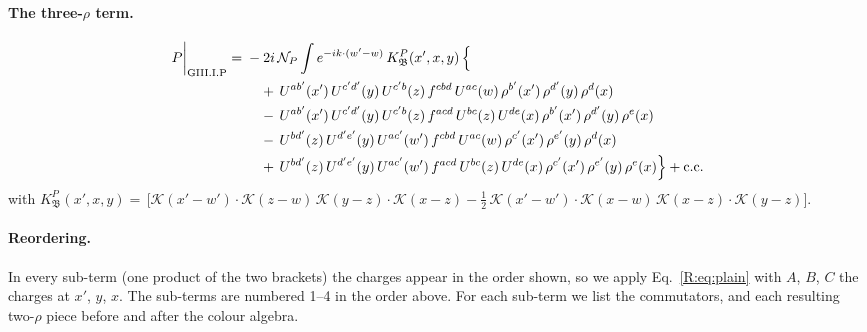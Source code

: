 \documentclass[10pt]{article}
\numberwithin{equation}{section}
\newcommand{\KK}{\mathcal K}
\newcommand{\NP}{\mathcal N_{P}}
\begin{document}
\paragraph{The three-$\rho$ term.}
\begin{align}
P\bigg|_{\rm GIII.I.P}={}&-2i\,\NP\int e^{-ik\cdot(w'-w)}\,K^{P}_{\mathfrak B}(x',x,y)\,\Big\{\notag\\
&\quad +\,U^{ab'}(x')\,U^{c'd'}(y)\,U^{c'b}(z)\,f^{cbd}\,U^{ac}(w)\,\rho^{b'}(x')\,\rho^{d'}(y)\,\rho^{d}(x)\notag\\
&\quad -\,U^{ab'}(x')\,U^{c'd'}(y)\,U^{c'b}(z)\,f^{acd}\,U^{bc}(z)\,U^{de}(x)\,\rho^{b'}(x')\,\rho^{d'}(y)\,\rho^{e}(x)\notag\\
&\quad -\,U^{bd'}(z)\,U^{d'e'}(y)\,U^{ac'}(w')\,f^{cbd}\,U^{ac}(w)\,\rho^{c'}(x')\,\rho^{e'}(y)\,\rho^{d}(x)\notag\\
&\quad +\,U^{bd'}(z)\,U^{d'e'}(y)\,U^{ac'}(w')\,f^{acd}\,U^{bc}(z)\,U^{de}(x)\,\rho^{c'}(x')\,\rho^{e'}(y)\,\rho^{e}(x)\Big\}+{\rm c.c.}\label{B:eq:in-GIII.I.P}
\end{align}
with $K^{P}_{\mathfrak B}(x',x,y)=\,\Big[\KK(x'-w')\cdot\KK(z-w)\,\KK(y-z)\cdot\KK(x-z)-\frac{1}{2}\,\KK(x'-w')\cdot\KK(x-w)\,\KK(x-z)\cdot\KK(y-z)\Big]$.
\paragraph{Reordering.} In every sub-term (one product of the two brackets) the charges appear in the order shown, so we apply Eq.~\eqref{R:eq:plain} with $A$, $B$, $C$ the charges at $x'$, $y$, $x$. The sub-terms are numbered 1--4 in the order above. For each sub-term we list the commutators, and each resulting two-$\rho$ piece before and after the colour algebra.
\end{document}
